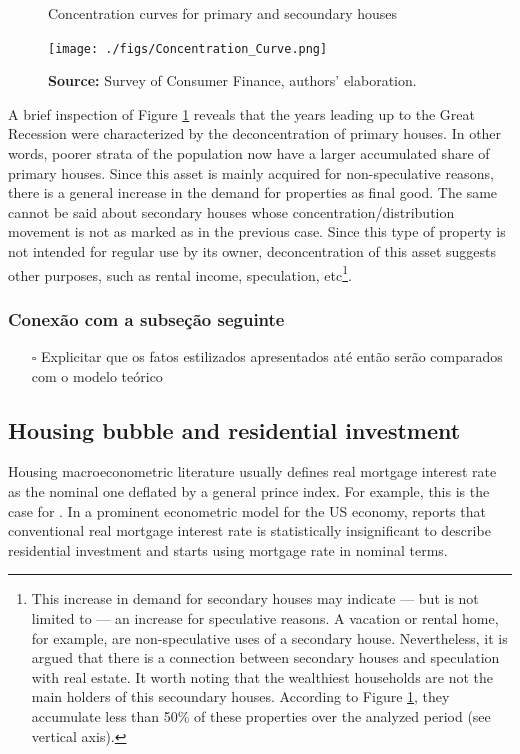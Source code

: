 \documentclass[11pt]{article}
\begin{document}
\begin{figure}[htb]
    \centering
        \caption{Concentration curves for primary and secoundary houses} 
    \texttt{[image: ./figs/Concentration\_Curve.png]}
    \label{fig:concentration}
    \caption*{\textbf{Source:} Survey of Consumer Finance, authors’ elaboration.}
\end{figure}


A brief inspection of Figure \ref{fig:concentration} reveals that the years leading up to the Great Recession were characterized by the deconcentration of primary houses. In other words, poorer strata of the population now have a larger accumulated share of primary houses. 
Since this asset is mainly acquired for non-speculative reasons, there is a general increase in the demand for properties as final good. The same cannot be said about secondary houses whose concentration/distribution movement is not as marked as in the previous case. Since this type of property is not intended for regular use by its owner, deconcentration of this asset suggests other purposes, such as rental income, speculation, etc\footnote{This increase in demand for secondary houses may indicate --- but is not limited to --- an increase for speculative reasons. A vacation or rental home, for example, are non-speculative uses of a secondary house. Nevertheless, it is argued that there is a connection between secondary houses and speculation with real estate. It worth noting that the wealthiest households are not the main holders of this secoundary houses. According to Figure \ref{fig:concentration}, they accumulate less than 50\% of these properties over the analyzed period (see vertical axis).}.

\subsubsection{Conexão com a subseção seguinte}
\label{sec:org6989a6a}


\begin{itemize}
\item[{$\square$}] Explicitar que os fatos estilizados apresentados até então serão comparados com o modelo teórico
\end{itemize}

\subsection{Housing bubble and residential investment}
\label{sec:org175cb32}

Housing macroeconometric literature usually defines real mortgage interest rate as the nominal one deflated by a general prince index.
For example, this is the case for \textcites{goodhart_house_2008}{arestis_economic_2019}{huang_is_2020}.
In a prominent econometric model for the US economy, \textcite{fair_macroeconometric_2013} reports that conventional real mortgage interest rate is statistically insignificant to describe residential investment and starts using mortgage rate in nominal terms.
\end{document}
